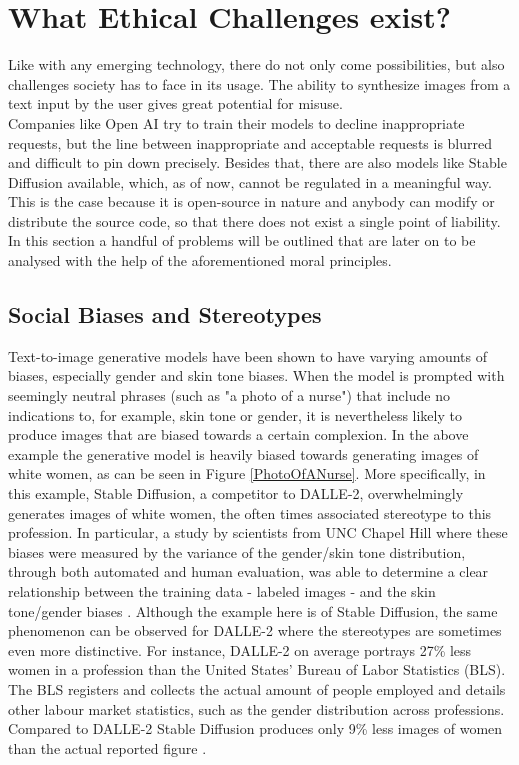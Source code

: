 \documentclass[10pt,twocolumn,twoside]{osajnl}
\begin{document}
\section{What Ethical Challenges exist?}
Like with any emerging technology, there do not only come possibilities, but also challenges society has to face in its usage.
The ability to synthesize images from a text input by the user gives great potential for misuse. \\
Companies like Open AI try to train their models to decline inappropriate requests, but the line between inappropriate and acceptable requests is blurred and difficult to pin down precisely. 
Besides that, there are also models like Stable Diffusion \cite{StableDiffusion} available, which, as of now, cannot be regulated in a meaningful way. 
This is the case because it is open-source in nature and anybody can modify or distribute the source code, so that there does not exist a single point of liability.
In this section a handful of problems will be outlined that are later on to be analysed with the help of the aforementioned moral principles.

\subsection{Social Biases and Stereotypes}
Text-to-image generative models have been shown to have varying amounts of biases, especially gender and skin tone biases. 
When the model is prompted with seemingly neutral phrases (such as "a photo of a nurse") that include no indications to, for example, skin tone or gender, it is nevertheless likely to produce images that are biased towards a certain complexion.
In the above example the generative model is heavily biased towards generating images of white women, as can be seen in Figure \ref{PhotoOfANurse}. 
More specifically, in this example, Stable Diffusion, a competitor to DALLE-2, overwhelmingly generates images of white women, the often times associated stereotype to this profession.
In particular, a study by scientists from UNC Chapel Hill where these biases were measured by the variance of the gender/skin tone distribution, through both automated and human evaluation,
was able to determine a clear relationship between the training data - labeled images - and the skin tone/gender biases \cite{DallEval}. 
Although the example here is of Stable Diffusion, the same phenomenon can be observed for DALLE-2 \cite{DalleSocialBias} where the stereotypes are sometimes even more distinctive. 
For instance, DALLE-2 on average portrays 27\% less women in a profession than the United States' Bureau of Labor Statistics (BLS). The BLS registers and collects the actual 
amount of people employed and details other labour market statistics, such as the gender distribution across professions. Compared to DALLE-2 Stable Diffusion produces only 9\% less images of women than the actual 
reported figure \cite{stablebias}. 
\end{document}
